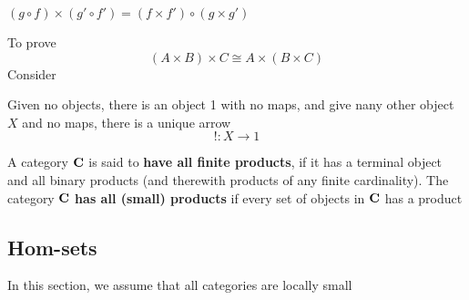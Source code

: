 \documentclass[11pt]{article}
\begin{document}
\begin{center}\end{center}
\((g\circ f)\times(g'\circ f')=(f\times f')\circ(g\times g')\)



To prove
\begin{equation*}
(A\times B)\times C\cong A\times (B\times C)
\end{equation*}
Consider
\begin{center}\end{center}


Given no objects, there is an object 1 with no maps, and give nany other
object \(X\) and no maps, there is a unique arrow
\begin{equation*}
!:X\to 1
\end{equation*}

\begin{definition}[]
A category \(\operatorname{\textbf{C}}\) is said to \textbf{have all finite products}, if it has a terminal
object and all binary products (and therewith products of any finite
cardinality). The category \(\operatorname{\textbf{C}}\) \textbf{has all (small) products} if every set of
objects in \(\operatorname{\textbf{C}}\) has a product
\end{definition}


\subsection{Hom-sets}
\label{sec:org1ada9a0}
In this section, we assume that all categories are locally small
\end{document}
